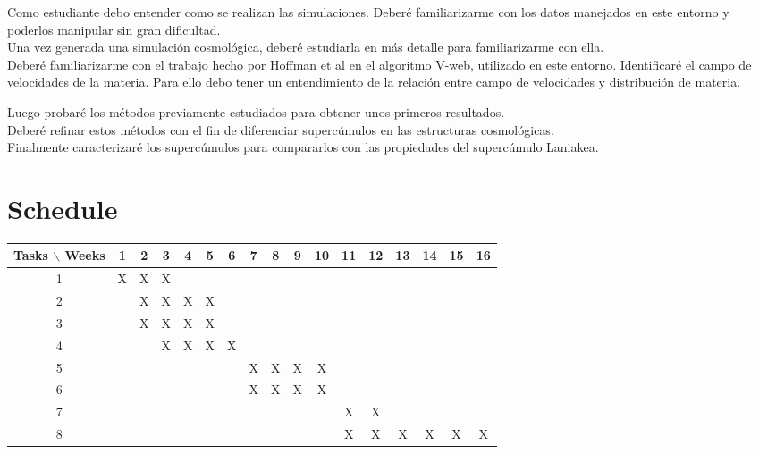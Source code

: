 \documentclass[12pt]{article}
\begin{document}
Como estudiante debo entender como se realizan las
simulaciones. Deber\'{e} familiarizarme con los datos manejados en
este entorno y poderlos manipular sin gran dificultad.
\\

Una vez generada una simulaci\'on cosmol\'{o}gica, 
deber\'{e} estudiarla en m\'{a}s detalle para familiarizarme con
ella.
\\
Deber\'{e} familiarizarme con el trabajo hecho por Hoffman et al\cite{hoffman_kinematic_2012} en el algoritmo V-web, utilizado en este entorno. Identificar\'{e} el campo de velocidades de la materia. Para ello debo tener un entendimiento de la relaci\'{o}n entre campo de velocidades  y distribuci\'{o}n de materia. 

Luego probar\'{e} los m\'{e}todos previamente estudiados para obtener unos
primeros resultados.  
\\

Deber\'{e} refinar estos m\'{e}todos con el fin de diferenciar
superc\'{u}mulos en las estructuras cosmol\'{o}gicas. 
\\

Finalmente caracterizar\'{e} los superc\'umulos para compararlos con las
propiedades del superc\'umulo Laniakea.

\section{Schedule}

\begin{table}[htb]
	\begin{tabular}{|c|cccccccccccccccc| }
	\hline
	Tasks $\backslash$ Weeks & 1 & 2 & 3 & 4 & 5 & 6 & 7 & 8 & 9 & 10 & 11 & 12 & 13 & 14 & 15 & 16  \\
	\hline
	1 & X & X & X &   &   &   &   &   &   &   &   &   &   &   &   &   \\
	2 &   & X & X & X & X &   &   &   &   &   &   &   &   &   &   &   \\
	3 &   & X & X & X & X &   &   &   &   &   &   &   &   &   &   &   \\
	4 &   &   & X & X & X & X &   &   &   &   &   &   &   &   &   &   \\
	5 &   &   &   &   &   &   & X & X & X & X &   &   &   &   &   &   \\
	6 &   &   &   &   &   &   & X & X & X & X &   &   &   &   &   &   \\
	7 &   &   &   &   &   &   &   &   &   &   & X & X &   &   &   &   \\
	8 &   &   &   &   &   &   &   &   &   &   & X & X & X & X & X & X \\
	\hline
	\end{tabular}
\end{table}
\vspace{1mm}
\end{document}
